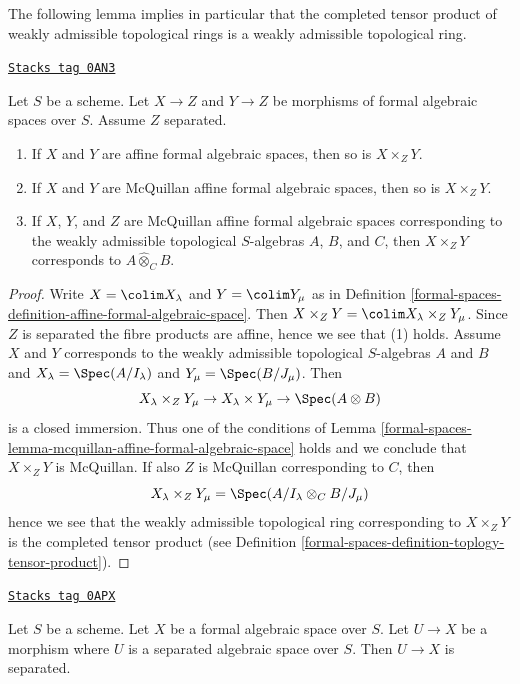 The following lemma implies in particular that the completed
tensor product of weakly admissible topological rings is
a weakly admissible topological ring.

\begin{lemma}
\label{formal-spaces-lemma-fibre-product-affines-over-separated}
\href{https://stacks.math.columbia.edu/tag/0AN3}{\texttt{Stacks tag 0AN3}}

Let $S$ be a scheme. Let $X \to Z$ and $Y \to Z$ be morphisms
of formal algebraic spaces over $S$. Assume $Z$ separated.
\begin{enumerate}
\item If $X$ and $Y$ are affine formal algebraic spaces, then
so is $X \times_Z Y$.
\item If $X$ and $Y$ are McQuillan affine formal algebraic spaces, then
so is $X \times_Z Y$.
\item If $X$, $Y$, and $Z$ are McQuillan affine formal algebraic spaces
corresponding to the weakly admissible topological $S$-algebras
$A$, $B$, and $C$, then $X \times_Z Y$ corresponds to
$A \widehat{\otimes}_C B$.
\end{enumerate}
\end{lemma}

\begin{proof}
Write $X = \colim X_\lambda$ and $Y = \colim Y_\mu$ as
in Definition \ref{formal-spaces-definition-affine-formal-algebraic-space}.
Then $X \times_Z Y = \colim X_\lambda \times_Z Y_\mu$.
Since $Z$ is separated the fibre products are affine, hence
we see that (1) holds. Assume $X$ and $Y$ corresponds to
the weakly admissible topological $S$-algebras $A$ and $B$
and $X_\lambda = \Spec(A/I_\lambda)$ and $Y_\mu = \Spec(B/J_\mu)$.
Then
$$
X_\lambda \times_Z Y_\mu \to
X_\lambda \times Y_\mu \to \Spec(A \otimes B)
$$
is a closed immersion. Thus one of the conditions of
Lemma \ref{formal-spaces-lemma-mcquillan-affine-formal-algebraic-space}
holds and we conclude that $X \times_Z Y$ is McQuillan.
If also $Z$ is McQuillan corresponding to $C$, then
$$
X_\lambda \times_Z Y_\mu = \Spec(A/I_\lambda \otimes_C B/J_\mu)
$$
hence we see that the weakly admissible topological ring
corresponding to $X \times_Z Y$ is the completed tensor product
(see Definition \ref{formal-spaces-definition-toplogy-tensor-product}).
\end{proof}

\begin{lemma}
\label{formal-spaces-lemma-separated-from-separated}
\href{https://stacks.math.columbia.edu/tag/0APX}{\texttt{Stacks tag 0APX}}

Let $S$ be a scheme. Let $X$ be a formal algebraic space over $S$.
Let $U \to X$ be a morphism where $U$ is a separated algebraic
space over $S$. Then $U \to X$ is separated.
\end{lemma}

